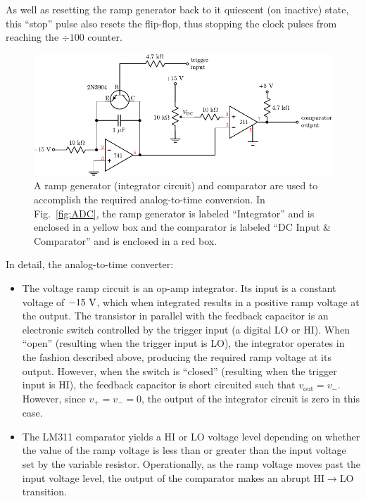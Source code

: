 \documentclass[12pt,oneside,openany,letterpaper]{article}
\begin{document}
\noindent As well as resetting the ramp generator back to it quiescent (on inactive) state, this ``stop'' pulse also resets the flip-flop, thus stopping the clock pulses from reaching the $\div 100$ counter.

\clearpage

\begin{figure}[h!]
\centering
    \includegraphics[width=\textwidth]{figures/ATC.pdf}
    \caption{A ramp generator (integrator circuit) and comparator are used to accomplish the required analog-to-time conversion.  In Fig.~\ref{fig:ADC}, the ramp generator is labeled ``Integrator'' and is enclosed in a yellow box and the comparator is labeled ``DC Input \& Comparator'' and is enclosed in a red box.}
    \label{fig:ATC}
\end{figure}

\noindent In detail, the analog-to-time converter:
\begin{itemize}
\item The voltage ramp circuit is an op-amp integrator. Its input is a constant voltage of $-15\rm\ V$, which when integrated results in a positive ramp voltage at the output. The transistor in parallel with the feedback capacitor is an electronic switch controlled by the trigger input (a digital LO or HI).  When ``open'' (resulting when the trigger input is LO), the integrator operates in the fashion described above, producing the required ramp voltage at its output. However, when the switch is ``closed'' (resulting when the trigger input is HI), the feedback capacitor is short circuited such that $v_\mathrm{out} = v_-$.  However, since $v_+ = v_- = 0$, the output of the integrator circuit is zero in this case.
\item The LM311 comparator yields a HI or LO voltage level depending on whether the value of the ramp voltage is less than or greater than the input voltage set by the variable resistor. Operationally, as the ramp voltage moves past the input voltage level, the output of the comparator makes an abrupt HI$\to$LO transition.
\end{itemize}
\end{document}
